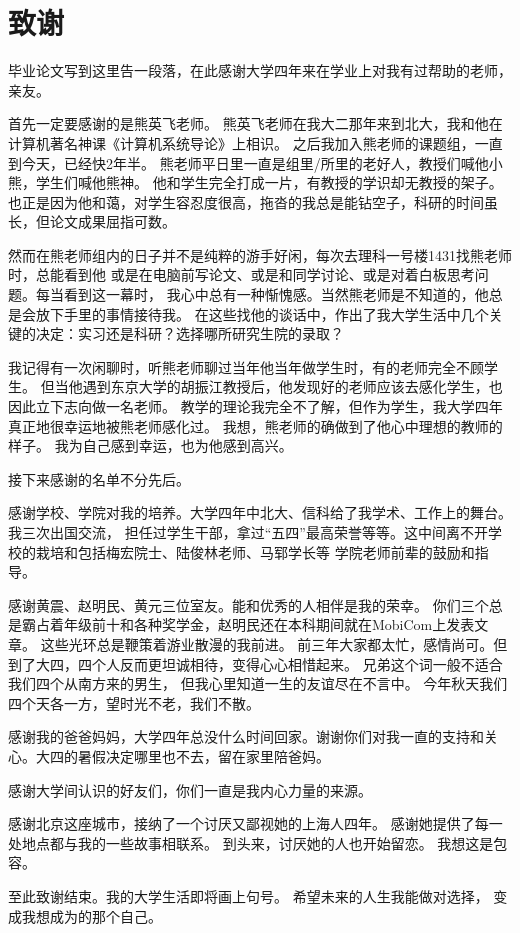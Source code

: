 
\chapter{致谢}

毕业论文写到这里告一段落，在此感谢大学四年来在学业上对我有过帮助的老师，亲友。

首先一定要感谢的是熊英飞老师。
熊英飞老师在我大二那年来到北大，我和他在计算机著名神课《计算机系统导论》上相识。
之后我加入熊老师的课题组，一直到今天，已经快2年半。
熊老师平日里一直是组里/所里的老好人，教授们喊他小熊，学生们喊他熊神。
他和学生完全打成一片，有教授的学识却无教授的架子。
也正是因为他和蔼，对学生容忍度很高，拖沓的我总是能钻空子，科研的时间虽长，但论文成果屈指可数。

然而在熊老师组内的日子并不是纯粹的游手好闲，每次去理科一号楼1431找熊老师时，总能看到他
或是在电脑前写论文、或是和同学讨论、或是对着白板思考问题。每当看到这一幕时，
我心中总有一种惭愧感。当然熊老师是不知道的，他总是会放下手里的事情接待我。
在这些找他的谈话中，作出了我大学生活中几个关键的决定：实习还是科研？选择哪所研究生院的录取？

我记得有一次闲聊时，听熊老师聊过当年他当年做学生时，有的老师完全不顾学生。
但当他遇到东京大学的胡振江教授后，他发现好的老师应该去感化学生，也因此立下志向做一名老师。
教学的理论我完全不了解，但作为学生，我大学四年真正地很幸运地被熊老师感化过。
我想，熊老师的确做到了他心中理想的教师的样子。
我为自己感到幸运，也为他感到高兴。

接下来感谢的名单不分先后。

感谢学校、学院对我的培养。大学四年中北大、信科给了我学术、工作上的舞台。我三次出国交流，
担任过学生干部，拿过“五四”最高荣誉等等。这中间离不开学校的栽培和包括梅宏院士、陆俊林老师、马郓学长等
学院老师前辈的鼓励和指导。

感谢黄震、赵明民、黄元三位室友。能和优秀的人相伴是我的荣幸。
你们三个总是霸占着年级前十和各种奖学金，赵明民还在本科期间就在MobiCom上发表文章。
这些光环总是鞭策着游业散漫的我前进。
前三年大家都太忙，感情尚可。但到了大四，四个人反而更坦诚相待，变得心心相惜起来。
兄弟这个词一般不适合我们四个从南方来的男生，
但我心里知道一生的友谊尽在不言中。
今年秋天我们四个天各一方，望时光不老，我们不散。

感谢我的爸爸妈妈，大学四年总没什么时间回家。谢谢你们对我一直的支持和关心。大四的暑假决定哪里也不去，留在家里陪爸妈。

感谢大学间认识的好友们，你们一直是我内心力量的来源。

感谢北京这座城市，接纳了一个讨厌又鄙视她的上海人四年。
感谢她提供了每一处地点都与我的一些故事相联系。
到头来，讨厌她的人也开始留恋。
我想这是包容。

至此致谢结束。我的大学生活即将画上句号。
希望未来的人生我能做对选择，
变成我想成为的那个自己。



